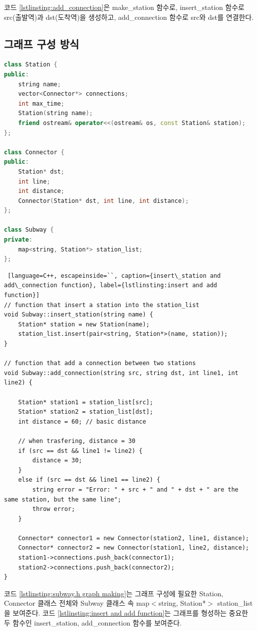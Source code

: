 \documentclass{article}
\begin{document}
코드 \ref{lstlinsting:add_connection}은 make\_station 함수로, insert\_station 함수로 src(출발역)과 dst(도착역)을 생성하고, add\_connection 함수로 src와 dst를 연결한다.

\subsection{그래프 구성 방식}
\begin{lstlisting}[language=C++, escapeinside=``, caption={subway.h 그래프 형성}, label={lstlinsting:subway.h graph making}]
class Station {
public:
	string name;
	vector<Connector*> connections;
	int max_time;
	Station(string name);
	friend ostream& operator<<(ostream& os, const Station& station);
};

class Connector {
public:
	Station* dst;
	int line;
	int distance;
	Connector(Station* dst, int line, int distance);
};

class Subway {
private:
	map<string, Station*> station_list;
};
\end{lstlisting}

\begin{lstlisting} [language=C++, escapeinside=``, caption={insert\_station and add\_connection function}, label={lstlinsting:insert and add function}]
// function that insert a station into the station_list
void Subway::insert_station(string name) {
	Station* station = new Station(name);
	station_list.insert(pair<string, Station*>(name, station));
}

// function that add a connection between two stations
void Subway::add_connection(string src, string dst, int line1, int line2) {
	
	Station* station1 = station_list[src];
	Station* station2 = station_list[dst];
	int distance = 60; // basic distance

	// when trasfering, distance = 30
	if (src == dst && line1 != line2) {
		distance = 30;
	}
	else if (src == dst && line1 == line2) {
		string error = "Error: " + src + " and " + dst + " are the same station, but the same line";
		throw error;
	}
	
	Connector* connector1 = new Connector(station2, line1, distance);
	Connector* connector2 = new Connector(station1, line2, distance);
	station1->connections.push_back(connector1);
	station2->connections.push_back(connector2);
}
\end{lstlisting}

코드 \ref{lstlinsting:subway.h graph making}는 그래프 구성에 필요한 Station, Connector 클래스 전체와 Subway 클래스 속 map$<$string, Station*$>$ station\_list을 보여준다. 코드 \ref{lstlinsting:insert and add function}는 그래프를 형성하는 중요한 두 함수인 insert\_station, add\_connection 함수를 보여준다.
\end{document}
